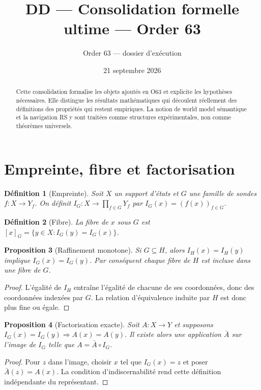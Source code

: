 \documentclass[11pt,a4paper]{article}
\newtheorem{definition}{Définition}[section]
\newtheorem{proposition}[definition]{Proposition}
\begin{document}
\title{DD — Consolidation formelle ultime — Order 63}\author{Order 63 — dossier d’exécution}\date{21 septembre 2026}\maketitle

\begin{abstract}
Cette consolidation formalise les objets ajoutés en O63 et explicite les hypothèses nécessaires. Elle distingue les résultats mathématiques qui découlent réellement des définitions des propriétés qui restent empiriques. La notion de world model sémantique et la navigation RS y sont traitées comme structures expérimentales, non comme théorèmes universels.
\end{abstract}

\section{Empreinte, fibre et factorisation}
\begin{definition}[Empreinte]
Soit $X$ un support d'états et $G$ une famille de sondes $f:X\to Y_f$. On définit $I_G:X\to\prod_{f\in G}Y_f$ par $I_G(x)=(f(x))_{f\in G}$.
\end{definition}

\begin{definition}[Fibre]
La fibre de $x$ sous $G$ est $[x]_G=\{y\in X:I_G(y)=I_G(x)\}$.
\end{definition}

\begin{proposition}[Raffinement monotone]
Si $G\subseteq H$, alors $I_H(x)=I_H(y)$ implique $I_G(x)=I_G(y)$. Par conséquent chaque fibre de $H$ est incluse dans une fibre de $G$.
\end{proposition}

\begin{proof}
L’égalité de $I_H$ entraîne l’égalité de chacune de ses coordonnées, donc des coordonnées indexées par $G$. La relation d’équivalence induite par $H$ est donc plus fine ou égale.
\end{proof}

\begin{proposition}[Factorisation exacte]
Soit $A:X\to Y$ et supposons $I_G(x)=I_G(y)\Rightarrow A(x)=A(y)$. Il existe alors une application $\bar A$ sur l’image de $I_G$ telle que $A=\bar A\circ I_G$.
\end{proposition}

\begin{proof}
Pour $z$ dans l’image, choisir $x$ tel que $I_G(x)=z$ et poser $\bar A(z)=A(x)$. La condition d’indiscernabilité rend cette définition indépendante du représentant.
\end{proof}
\end{document}
